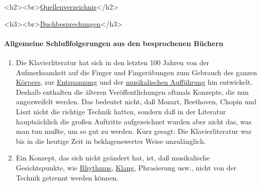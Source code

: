 
\label{reference}

<h2><br>\underline{Quellenverzeichnis}</h2>

<h3><br>\underline{Buchbesprechungen}</h3>

\paragraph{Allgemeine Schlußfolgerungen aus den besprochenen Büchern}
\label{allgemein}

\begin{enumerate}[label={\arabic*.}] 
\item Die Klavierliteratur hat sich in den letzten 100 Jahren von der Aufmerksamkeit auf die Finger und Fingerübungen zum Gebrauch des ganzen \hyperref[c1iii4c]{Körpers}, zur \hyperref[c1ii14]{Entspannung} und der \hyperref[c1iii14d]{musikalischen Aufführung} hin entwickelt.
Deshalb enthalten die älteren Veröffentlichungen oftmals Konzepte, die nun angezweifelt werden.
Das bedeutet nicht, daß Mozart, Beethoven, Chopin und Liszt nicht die richtige Technik hatten, sondern daß in der Literatur hauptsächlich die großen Auftritte aufgezeichnet wurden aber nicht das, was man tun mußte, um so gut zu werden.
Kurz gesagt: Die Klavierliteratur war bis in die heutige Zeit in beklagenswerter Weise unzulänglich.

\item Ein Konzept, das sich nicht geändert hat, ist, daß musikalische Gesichtspunkte, wie \hyperref[c1iii1b]{Rhythmus}, \hyperref[c1iii1]{Klang}, Phrasierung usw., nicht von der Technik getrennt werden können.


\end{enumerate}
